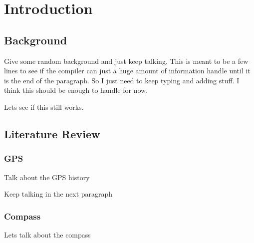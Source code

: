 \chapter{Introduction}
\section{Background}
Give some random background and just keep talking. This is meant to be a few lines to
see if the compiler can just a huge amount of information handle
until it is the end of the paragraph. So I just need to keep typing and adding stuff.
I think this should be enough to handle for now.\par
Lets see if this still works.
\section{Literature Review}
\subsection{GPS}
Talk about the GPS history\par
Keep talking in the next paragraph
\subsection{Compass}
Lets talk about the compass

